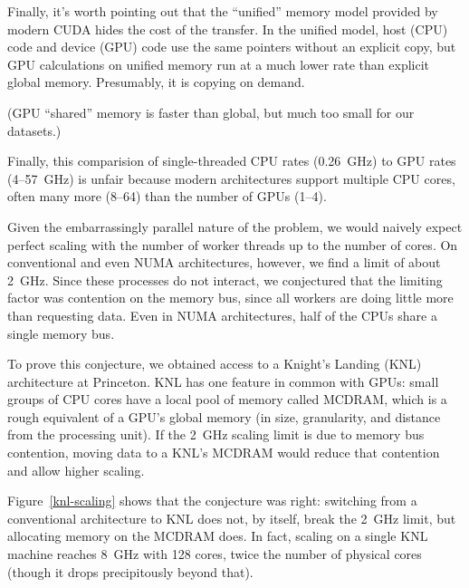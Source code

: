 \documentclass[12pt]{article}
\begin{document}
Finally, it's worth pointing out that the ``unified'' memory model provided by modern CUDA hides the cost of the transfer. In the unified model, host (CPU) code and device (GPU) code use the same pointers without an explicit copy, but GPU calculations on unified memory run at a much lower rate than explicit global memory. Presumably, it is copying on demand.

(GPU ``shared'' memory is faster than global, but much too small for our datasets.)

Finally, this comparision of single-threaded CPU rates (0.26~GHz) to GPU rates (4--57~GHz) is unfair because modern architectures support multiple CPU cores, often many more (8--64) than the number of GPUs (1--4).

Given the embarrassingly parallel nature of the problem, we would naively expect perfect scaling with the number of worker threads up to the number of cores. On conventional and even NUMA architectures, however, we find a limit of about 2~GHz. Since these processes do not interact, we conjectured that the limiting factor was contention on the memory bus, since all workers are doing little more than requesting data. Even in NUMA architectures, half of the CPUs share a single memory bus.

To prove this conjecture, we obtained access to a Knight's Landing (KNL) architecture at Princeton. KNL has one feature in common with GPUs: small groups of CPU cores have a local pool of memory called MCDRAM, which is a rough equivalent of a GPU's global memory (in size, granularity, and distance from the processing unit). If the 2~GHz scaling limit is due to memory bus contention, moving data to a KNL's MCDRAM would reduce that contention and allow higher scaling.

Figure~\ref{knl-scaling} shows that the conjecture was right: switching from a conventional architecture to KNL does not, by itself, break the 2~GHz limit, but allocating memory on the MCDRAM does. In fact, scaling on a single KNL machine reaches 8~GHz with 128 cores, twice the number of physical cores (though it drops precipitously beyond that).
\end{document}
